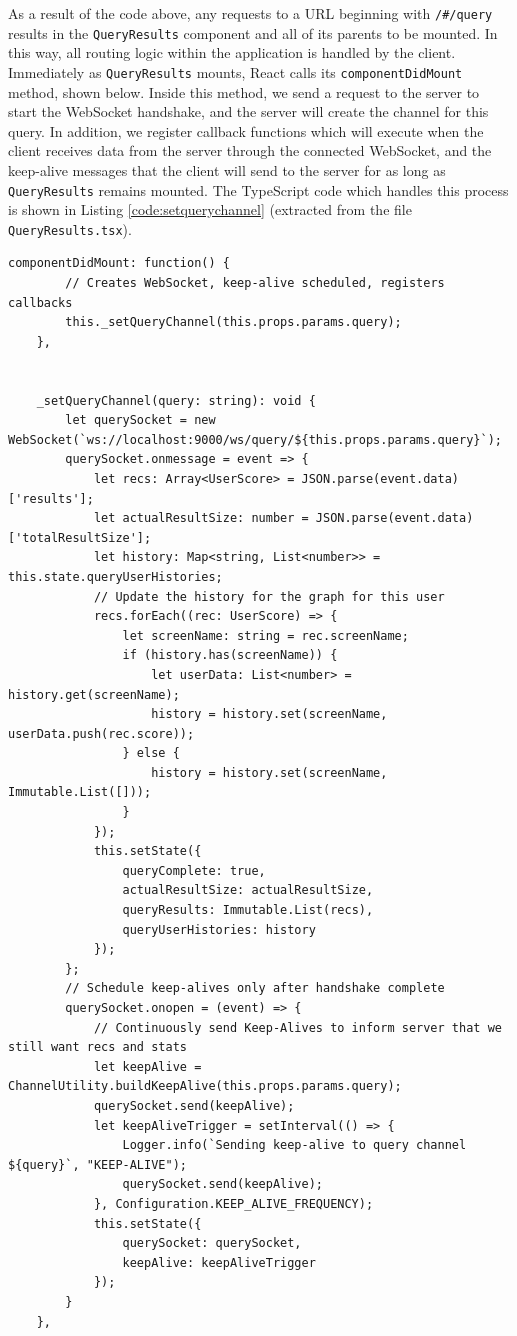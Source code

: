 \documentclass{l4proj}
\newcommand{\code}[1]{\texttt{#1}}
\begin{document}
As a result of the code above, any requests to a URL beginning with \code{/\#/query} results in the \code{QueryResults} component and all of its parents to be mounted. In this way, all routing logic within the application is handled by the client. Immediately as \code{QueryResults} mounts, React calls its \code{componentDidMount} method, shown below. Inside this method, we send a request to the server to start the WebSocket handshake, and the server will create the channel for this query. In addition, we register callback functions which will execute when the client receives data from the server through the connected WebSocket, and the keep-alive messages that the client will send to the server for as long as \code{QueryResults} remains mounted. The TypeScript code which handles this process is shown in Listing \ref{code:setquerychannel} (extracted from the file \code{QueryResults.tsx}).

\begin{lstlisting}[caption=The method called by React when a new component mounts.,label=code:setquerychannel]
    componentDidMount: function() {
        // Creates WebSocket, keep-alive scheduled, registers callbacks
        this._setQueryChannel(this.props.params.query);
    },


    _setQueryChannel(query: string): void {
        let querySocket = new WebSocket(`ws://localhost:9000/ws/query/${this.props.params.query}`);
        querySocket.onmessage = event => {
            let recs: Array<UserScore> = JSON.parse(event.data)['results'];
            let actualResultSize: number = JSON.parse(event.data)['totalResultSize'];
            let history: Map<string, List<number>> = this.state.queryUserHistories;
            // Update the history for the graph for this user
            recs.forEach((rec: UserScore) => {
                let screenName: string = rec.screenName;
                if (history.has(screenName)) {
                    let userData: List<number> = history.get(screenName);
                    history = history.set(screenName, userData.push(rec.score));
                } else {
                    history = history.set(screenName, Immutable.List([]));
                }
            });
            this.setState({
                queryComplete: true,
                actualResultSize: actualResultSize,
                queryResults: Immutable.List(recs),
                queryUserHistories: history
            });
        };
        // Schedule keep-alives only after handshake complete
        querySocket.onopen = (event) => {
            // Continuously send Keep-Alives to inform server that we still want recs and stats
            let keepAlive = ChannelUtility.buildKeepAlive(this.props.params.query);
            querySocket.send(keepAlive);
            let keepAliveTrigger = setInterval(() => {
                Logger.info(`Sending keep-alive to query channel ${query}`, "KEEP-ALIVE");
                querySocket.send(keepAlive);
            }, Configuration.KEEP_ALIVE_FREQUENCY);
            this.setState({
                querySocket: querySocket,
                keepAlive: keepAliveTrigger
            });
        }
    },

\end{lstlisting}
        
\end{document}
